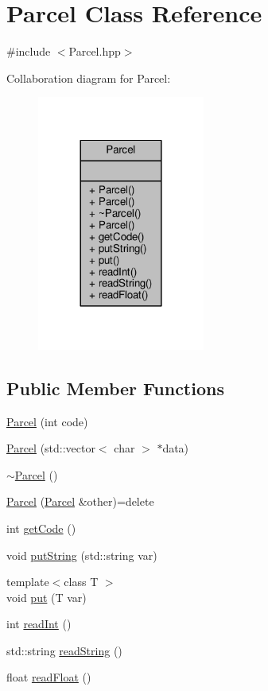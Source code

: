 \hypertarget{class_parcel}{\section{Parcel Class Reference}
\label{class_parcel}
}


{\ttfamily \#include $<$Parcel.\-hpp$>$}



Collaboration diagram for Parcel\-:
\nopagebreak
\begin{figure}[H]
\begin{center}
\leavevmode
\includegraphics[width=156pt]{class_parcel__coll__graph}
\end{center}
\end{figure}
\subsection*{Public Member Functions}
\begin{DoxyCompactItemize}
\item 
\hyperlink{class_parcel_ac4940394afdfc35d38d695d4b0e14956}{Parcel} (int code)
\item 
\hyperlink{class_parcel_a8fe786594990e38b7aecb1e994aa50fc}{Parcel} (std\-::vector$<$ char $>$ $\ast$data)
\item 
\hyperlink{class_parcel_a7a5f1bd543d5685042b7ab61399abfc6}{$\sim$\-Parcel} ()
\item 
\hyperlink{class_parcel_a75b0f276e47657edb2cc4f51d571158e}{Parcel} (\hyperlink{class_parcel}{Parcel} \&other)=delete
\item 
int \hyperlink{class_parcel_a6f146387f34b3d2ac590f33b5126bc23}{get\-Code} ()
\item 
void \hyperlink{class_parcel_a0b164ec23965e3f37dd8a0d99321e232}{put\-String} (std\-::string var)
\item 
{\footnotesize template$<$class T $>$ }\\void \hyperlink{class_parcel_a19b5c8e0abaec80ea10da49d0832ad5b}{put} (T var)
\item 
int \hyperlink{class_parcel_a4540d13bf8699f6f3bcafd9e95bce706}{read\-Int} ()
\item 
std\-::string \hyperlink{class_parcel_ad0d3b72bb1ca2319bab9a1981f60cd53}{read\-String} ()
\item 
float \hyperlink{class_parcel_aea33f46c6e77dd0c297e1ef5fdf5973e}{read\-Float} ()
\end{DoxyCompactItemize}


